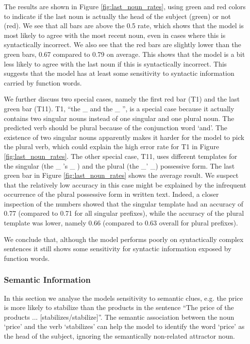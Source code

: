 The results are shown in Figure \ref{fig:last_noun_rates},
using green and red colors to indicate if 
the last noun is actually the head of the subject (green)
or not (red). 
%
We see that all bars are above the 0.5 rate,
which shows that the model is most
likely to agree with the most recent noun,
even in cases where this is syntactically incorrect. 
%
We also see that the red bars are slightly
lower than the green bars,
0.67 compared to 0.79 on average.
This shows that the model is a bit less likely
to agree with the last noun if this is
syntactically incorrect.
This suggests that the model has 
at least some sensitivity
to syntactic information carried by function words.
%

%
We further discuss two special cases,
namely the first red bar (T1) and 
the last green bar (T11).
T1, ``the \_ and the \_ '', is a special case because it 
actually contains two singular nouns
instead of one singular and one plural noun. 
The predicted verb should be plural because of the
conjunction word `and'.
The existence of two singular nouns 
apparently makes it harder for the model
to pick the plural verb,
which could explain the high error rate
for T1 in Figure \ref{fig:last_noun_rates}.
%
The other special case, T11, uses different templates for the singular 
(the \_ 's \_ ) and the plural (the \_' \_) possessive form.
The last green bar in Figure \ref{fig:last_noun_rates} shows the average result.
We suspect that the relatively low accuracy
in this case might be explained by the infrequent
occurrence of the plural possessive form in written text.
Indeed, a closer inspection of the numbers showed that
the singular template had an accuracy
of 0.77 (compared to 0.71 for all singular prefixes), 
while the accuracy of the plural template
was lower, namely 0.66 (compared to 0.63 overall for plural prefixes).
%

We conclude that, although the model 
performs poorly on syntactically complex sentences it
still shows some sensitivity for syntactic 
information exposed by function words. 


\subsubsection{Semantic Information}

In this section we analyse the models sensitivity
to semantic clues, e.g. the price is more likely
to stabilize than the products in the sentence
``The price of the products ... [stabilizes/stabilize]''.
The semantic association between the noun `price' and the
verb `stabilizes' can help the model to identify
the word `price' as the head of the subject,
ignoring the semantically non-related attractor noun.
  
